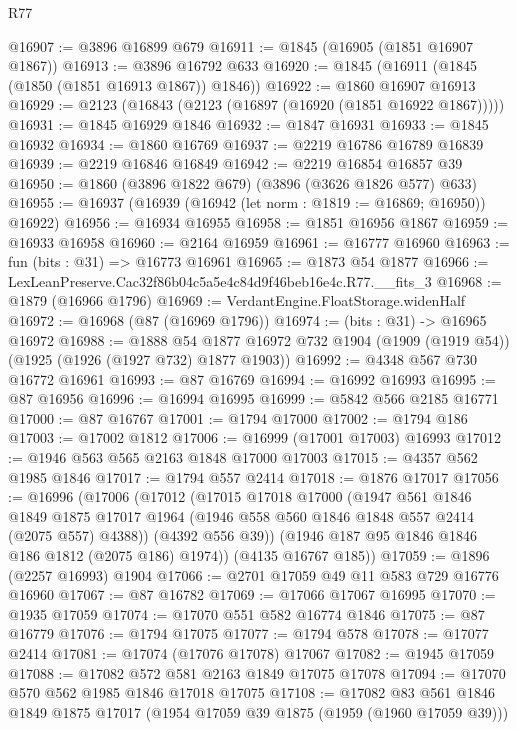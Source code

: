 \begin{lexlean}{R77}
\begin{coremodule}
@16907 := @3896 @16899 @679
@16911 := @1845 (@16905 (@1851 @16907 @1867))
@16913 := @3896 @16792 @633
@16920 := @1845 (@16911 (@1845 (@1850 (@1851 @16913 @1867)) @1846))
@16922 := @1860 @16907 @16913
@16929 := @2123 (@16843 (@2123 (@16897 (@16920 (@1851 @16922 @1867)))))
@16931 := @1845 @16929 @1846
@16932 := @1847 @16931
@16933 := @1845 @16932
@16934 := @1860 @16769
@16937 := @2219 @16786 @16789 @16839
@16939 := @2219 @16846 @16849
@16942 := @2219 @16854 @16857 @39
@16950 := @1860 (@3896 @1822 @679) (@3896 (@3626 @1826 @577) @633)
@16955 := @16937 (@16939 (@16942 (let norm : @1819 := @16869; @16950)) @16922)
@16956 := @16934 @16955
@16958 := @1851 @16956 @1867
@16959 := @16933 @16958
@16960 := @2164 @16959
@16961 := @16777 @16960
@16963 := fun (bits : @31) => @16773 @16961
@16965 := @1873 @54 @1877
@16966 := LexLeanPreserve.Cac32f86b04c5a5e4c84d9f46beb16e4c.R77.__fits_3
@16968 := @1879 (@16966 @1796)
@16969 := VerdantEngine.FloatStorage.widenHalf
@16972 := @16968 (@87 (@16969 @1796))
@16974 := (bits : @31) -> @16965 @16972
@16988 := @1888
    @54
    @1877
    @16972
    @732
    @1904
    (@1909 (@1919 @54))
    (@1925 (@1926 (@1927 @732) @1877 @1903))
@16992 := @4348 @567 @730 @16772 @16961
@16993 := @87 @16769
@16994 := @16992 @16993
@16995 := @87 @16956
@16996 := @16994 @16995
@16999 := @5842 @566 @2185 @16771
@17000 := @87 @16767
@17001 := @1794 @17000
@17002 := @1794 @186
@17003 := @17002 @1812
@17006 := @16999 (@17001 @17003) @16993
@17012 := @1946 @563 @565 @2163 @1848 @17000 @17003
@17015 := @4357 @562 @1985 @1846
@17017 := @1794 @557 @2414
@17018 := @1876 @17017
@17056 := @16996
    (@17006
      (@17012
        (@17015
          @17018
          @17000
          (@1947
            @561
            @1846
            @1849
            @1875
            @17017
            @1964
            (@1946 @558 @560 @1846 @1848 @557 @2414 (@2075 @557) @4388))
          (@4392 @556 @39))
        (@1946 @187 @95 @1846 @1846 @186 @1812 (@2075 @186) @1974))
      (@4135 @16767 @185))
@17059 := @1896 (@2257 @16993) @1904
@17066 := @2701 @17059 @49 @11 @583 @729 @16776 @16960
@17067 := @87 @16782
@17069 := @17066 @17067 @16995
@17070 := @1935 @17059
@17074 := @17070 @551 @582 @16774 @1846
@17075 := @87 @16779
@17076 := @1794 @17075
@17077 := @1794 @578
@17078 := @17077 @2414
@17081 := @17074 (@17076 @17078) @17067
@17082 := @1945 @17059
@17088 := @17082 @572 @581 @2163 @1849 @17075 @17078
@17094 := @17070 @570 @562 @1985 @1846 @17018 @17075
@17108 := @17082
    @83
    @561
    @1846
    @1849
    @1875
    @17017
    (@1954 @17059 @39 @1875 (@1959 (@1960 @17059 @39)))

\end{coremodule}
\end{lexlean}
